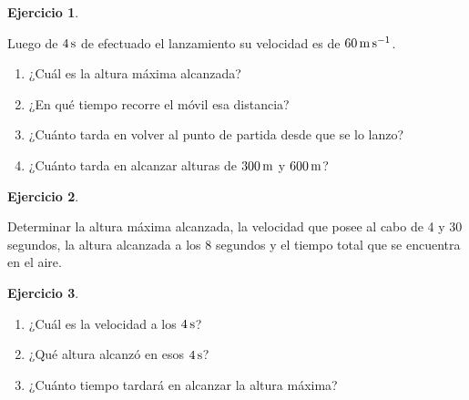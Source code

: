 \documentclass[a4paper,12pt,twoside]{book}
\newtheorem{ejercicio}{{Ejercicio}}[chapter]
\begin{document}
\begin{mdframed}[style=ejercicio-facil]
    \begin{ejercicio}
    \end{ejercicio}
    Luego de $4 \, \si{\second}$ de efectuado el lanzamiento su velocidad es de $60 \, \si{\metre\per\second}$.
    \begin{enumerate}
        \item ¿Cuál es la altura máxima alcanzada?
        \item ¿En qué tiempo recorre el móvil esa distancia?
        \item ¿Cuánto tarda en volver al punto de partida desde que se lo lanzo?
        \item ¿Cuánto tarda en alcanzar alturas de $300 \, \si{\metre}$ y $600 \, \si{\metre}$?
    \end{enumerate}
\end{mdframed}

\begin{mdframed}[style=ejercicio-facil]
    \begin{ejercicio}
    \end{ejercicio}
    Determinar la altura máxima alcanzada, la velocidad que posee al cabo de 4 y 30 segundos, la altura alcanzada a los 8 segundos y el tiempo total que se encuentra en el aire.
\end{mdframed}

\begin{mdframed}[style=ejercicio-facil]
    \begin{ejercicio}
    \end{ejercicio}
    \begin{enumerate}
        \item ¿Cuál es la velocidad a los $4 \, \si{\second}$?
        \item ¿Qué altura alcanzó en esos $4 \, \si{\second}$?
        \item ¿Cuánto tiempo tardará en alcanzar la altura máxima?
    \end{enumerate}
\end{mdframed}
\end{document}
